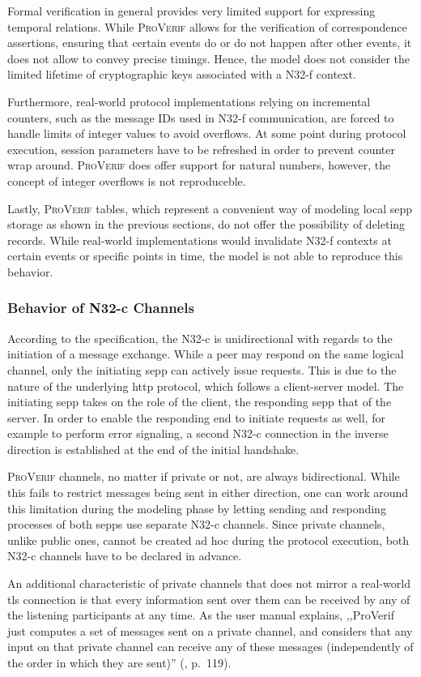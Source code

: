 Formal verification in general provides very limited support for expressing temporal relations.
While \textsc{ProVerif} allows for the verification of correspondence assertions, ensuring that certain events do or do not happen after other events, it does not allow to convey precise timings.
Hence, the model does not consider the limited lifetime of cryptographic keys associated with a N32-f context.

Furthermore, real-world protocol implementations relying on incremental counters, such as the message IDs used in N32-f communication, are forced to handle limits of integer values to avoid overflows.
At some point during protocol execution, session parameters have to be refreshed in order to prevent counter wrap around.
\textsc{ProVerif} does offer support for natural numbers, however, the concept of integer overflows is not reproduceble.

Lastly, \textsc{ProVerif} tables, which represent a convenient way of modeling local \gls{sepp} storage as shown in the previous sections, do not offer the possibility of deleting records.
While real-world implementations would invalidate N32-f contexts at certain events or specific points in time, the model is not able to reproduce this behavior.

\subsubsection{Behavior of N32-c Channels}

According to the specification, the N32-c is unidirectional with regards to the initiation of a message exchange.
While a peer may respond on the same logical channel, only the initiating \gls{sepp} can actively issue requests.
This is due to the nature of the underlying \gls{http} protocol, which follows a client-server model.
The initiating \gls{sepp} takes on the role of the client, the responding \gls{sepp} that of the server.
In order to enable the responding end to initiate requests as well, for example to perform error signaling, a second N32-c connection in the inverse direction is established at the end of the initial handshake.

\textsc{ProVerif} channels, no matter if private or not, are always bidirectional.
While this fails to restrict messages being sent in either direction, one can work around this limitation during the modeling phase by letting sending and responding processes of both \glspl{sepp} use separate N32-c channels.
Since private channels, unlike public ones, cannot be created ad hoc during the protocol execution, both N32-c channels have to be declared in advance.

An additional characteristic of private channels that does not mirror a real-world \gls{tls} connection is that every information sent over them can be received by any of the listening participants at any time.
As the user manual explains, ,,ProVerif just computes a set of messages sent on a private channel, and considers that any input on that private channel can receive any of these messages (independently of the order in which
they are sent)'' (\cite{blanchet2020proverif}, p.~119).
